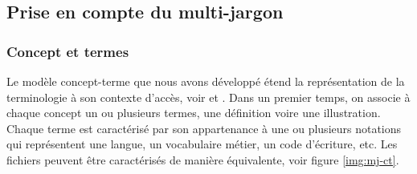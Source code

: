 













\subsection{Prise en compte du multi-jargon}\label{}

\subsubsection{Concept et termes}\label{sec:onter}
Le modèle concept-terme que nous avons développé étend la représentation de la terminologie à son contexte d'accès, voir \cite{Diemert2010} et \cite{Diemert2011a}. Dans un premier temps, on associe à chaque concept un ou plusieurs termes, une définition voire une illustration. Chaque terme est caractérisé par son appartenance à une ou plusieurs notations qui représentent une langue, un vocabulaire métier, un code d'écriture, etc. Les fichiers peuvent être caractérisés de manière équivalente, voir figure \ref{img:mj-ct}.


